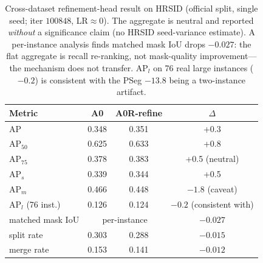 \documentclass[journal]{IEEEtran}
\begin{document}
\begin{table}[t]
\centering
\caption{Cross-dataset refinement-head result on HRSID (official split, single seed; iter $100848$, LR$\approx0$). The aggregate is neutral and reported \emph{without} a significance claim (no HRSID seed-variance estimate). A per-instance analysis finds matched mask IoU drops $-0.027$: the flat aggregate is recall re-ranking, not mask-quality improvement---the mechanism does not transfer. AP$_{l}$ on 76 real large instances ($-0.2$) is consistent with the PSeg $-13.8$ being a two-instance artifact.}
\label{tab:main-hrsid}
\begin{tabular}{@{}lccc@{}}
\toprule
Metric & A0 & A0R-refine & $\Delta$ \\
\midrule
AP                  & 0.348 & 0.351 & +0.3 \\
AP$_{50}$           & 0.625 & 0.633 & +0.8 \\
AP$_{75}$           & 0.378 & 0.383 & +0.5 \;(neutral) \\
AP$_{s}$            & 0.339 & 0.344 & +0.5 \\
AP$_{m}$            & 0.466 & 0.448 & $-1.8$ \;(caveat) \\
AP$_{l}$ (76 inst.) & 0.126 & 0.124 & $-0.2$ \;(consistent with) \\
matched mask IoU    & \multicolumn{2}{c}{per-instance} & $-0.027$ \\
split rate          & 0.303 & 0.288 & $-0.015$ \\
merge rate          & 0.153 & 0.141 & $-0.012$ \\
\bottomrule
\end{tabular}
\end{table}
\end{document}
